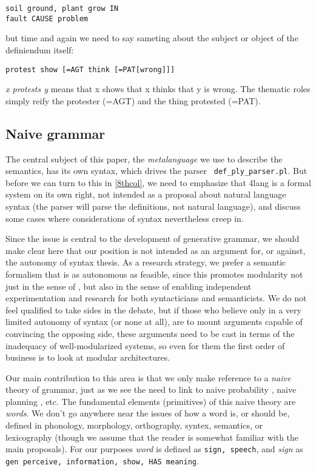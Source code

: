 \documentclass[11pt,bookmarks,bookmarksnumbered,naturalnames,plainpages=false,pdftex,colorlinks=true,urlcolor=blue,bookmarksdepth=subsection,plainpages=false]{paper}
\begin{document}
\begin{verbatim}
soil ground, plant grow IN
fault CAUSE problem
\end{verbatim}

\noindent
but time and again we need to say sameting about the subject or object of the
definiendum itself: 

\begin{verbatim}
protest show [=AGT think [=PAT[wrong]]]
\end{verbatim}

\noindent
{\it x protests y} means that x shows that x thinks that y is wrong. The
thematic roles simply reify the protester (=AGT) and the thing protested
(=PAT). 

\subsection{Naive grammar}\label{naivegrammar}

The central subject of this paper, the {\it metalanguage} we use to describe
the semantics, has its own syntax, which drives the parser {\tt
  def\_ply\_parser.pl}. But before we can turn to this in \ref{8thcol}, we need
to emphasize that 4lang is a formal system on its own right, not intended as a
proposal about natural language syntax (the parser will parse the definitions,
not natural language), and discuss some cases where considerations of syntax
nevertheless creep in.

Since the issue is central to the development of generative grammar, we should
make clear here that our position is not intended as an argument for, or
against, the autonomy of syntax thesis. As a research strategy, we prefer a
semantic formalism that is as autonomous as feasible, since this promotes
modularity not just in the sense of \cite{Fodor:1983}, but also in the sense
of enabling independent experimentation and research for both syntacticians
and semanticists. We do not feel qualified to take sides in the debate, but if
those who believe only in a very limited autonomy of syntax (or none at all),
are to mount arguments capable of convincing the opposing side, these
arguments need to be cast in terms of the inadequacy of well-modularized
systems, so even for them the first order of business is to look at modular
architectures. 

Our main contribution to this area is that we only make reference to a {\it
  naive} theory of grammar, just as we see the need to link to naive
probability \citep{Gyenis:2019}, naive planning \citep{Gordon:2017}, etc.
The fundamental elements (primitives) of this naive theory are {\it words}. We
don't go anywhere near the issues of how a word is, or should be, defined in
phonology, morphology, orthography, syntex, semantics, or lexicography (though
we assume that the reader is somewhat familiar with the main proposals). For
our purposes {\it word} is defined as {\tt sign, speech}, and {\it sign} as
{\tt gen perceive, information, show, HAS meaning}.
\end{document}
